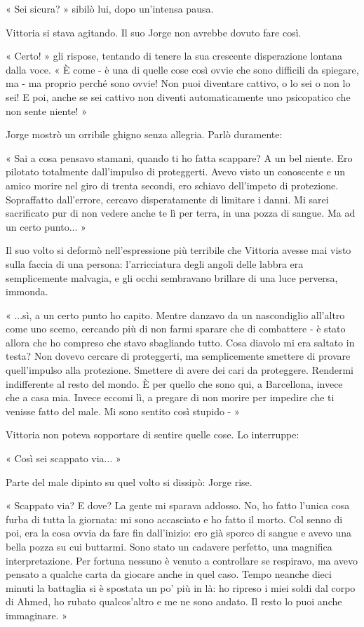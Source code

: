 « Sei sicura? » sibilò lui, dopo un'intensa pausa.

Vittoria si stava agitando. Il suo Jorge non avrebbe dovuto fare così.

« Certo! » gli rispose, tentando di tenere la sua crescente disperazione lontana dalla voce. « È come - è una di quelle cose così ovvie che sono difficili da spiegare, ma - ma proprio perché sono ovvie! Non puoi diventare cattivo, o lo sei o non lo sei! E poi, anche se sei cattivo non diventi automaticamente uno psicopatico che non sente niente! »

Jorge mostrò un orribile ghigno senza allegria. Parlò duramente:

« Sai a cosa pensavo stamani, quando ti ho fatta scappare? A un bel niente. Ero pilotato totalmente dall'impulso di proteggerti. Avevo visto un conoscente e un amico morire nel giro di trenta secondi, ero schiavo dell'impeto di protezione. Sopraffatto dall'errore, cercavo disperatamente di limitare i danni. Mi sarei sacrificato pur di non vedere anche te lì per terra, in una pozza di sangue. Ma ad un certo punto... »

Il suo volto si deformò nell'espressione più terribile che Vittoria avesse mai visto sulla faccia di una persona: l'arricciatura degli angoli delle labbra era semplicemente malvagia, e gli occhi sembravano brillare di una luce perversa, immonda.

« ...sì, a un certo punto ho capito. Mentre danzavo da un nascondiglio all'altro come uno scemo, cercando più di non farmi sparare che di combattere - è stato allora che ho compreso che stavo sbagliando tutto. Cosa diavolo mi era saltato in testa? Non dovevo cercare di proteggerti, ma semplicemente smettere di provare quell'impulso alla protezione. Smettere di avere dei cari da proteggere. Rendermi indifferente al resto del mondo. È per quello che sono qui, a Barcellona, invece che a casa mia. Invece eccomi lì, a pregare di non morire per impedire che ti venisse fatto del male. Mi sono sentito così stupido - »

Vittoria non poteva sopportare di sentire quelle cose. Lo interruppe:

« Così sei scappato via... »

Parte del male dipinto su quel volto si dissipò: Jorge rise.

« Scappato via? E dove? La gente mi sparava addosso. No, ho fatto l'unica cosa furba di tutta la giornata: mi sono accasciato e ho fatto il morto. Col senno di poi, era la cosa ovvia da fare fin dall'inizio: ero già sporco di sangue e avevo una bella pozza su cui buttarmi. Sono stato un cadavere perfetto, una magnifica interpretazione. Per fortuna nessuno è venuto a controllare se respiravo, ma avevo pensato a qualche carta da giocare anche in quel caso. Tempo neanche dieci minuti la battaglia si è spostata un po' più in là: ho ripreso i miei soldi dal corpo di Ahmed, ho rubato qualcos'altro e me ne sono andato. Il resto lo puoi anche immaginare. »

